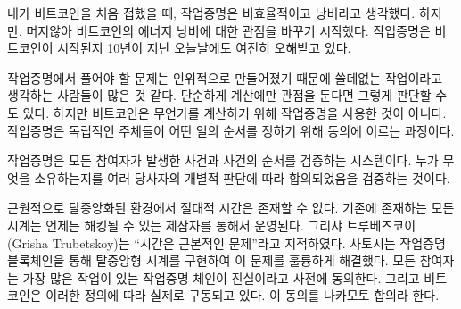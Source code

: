 \begin{comment}
When I first learned how Bitcoin works I also thought that proof-of-work
is inefficient and wasteful. After a while, I started to shift my
perspective on Bitcoin's energy consumption~\cite{gigi:energy}. It seems that
proof-of-work is still widely misunderstood today, in the year 10 AB
(after Bitcoin).
\end{comment}
내가 비트코인을 처음 접했을 때, 작업증명은 비효율적이고 낭비라고 생각했다.
하지만, 머지않아 비트코인의 에너지 낭비\cite{gigi:energy}에 대한 관점을 바꾸기 시작했다.
작업증명은 비트코인이 시작된지 10년이 지난 오늘날에도 여전히 오해받고 있다.

\begin{comment}
Since the problems to be solved in proof-of-work are made up, many
people seem to believe that it is \textit{useless} work. If the focus is purely
on the computation, this is an understandable conclusion. But Bitcoin
isn't about computation. It is about \textit{independently agreeing on the
order of things.}
\end{comment}
작업증명에서 풀어야 할 문제는 인위적으로 만들어졌기 때문에 쓸데없는 작업이라고 생각하는 사람들이 많은 것 같다.
단순하게 계산에만 관점을 둔다면 그렇게 판단할 수도 있다.
하지만 비트코인은 무언가를 계산하기 위해 작업증명을 사용한 것이 아니다.
작업증명은 독립적인 주체들이 어떤 일의 순서를 정하기 위해 동의에 이르는 과정이다.

\begin{comment}
Proof-of-work is a system in which everyone can validate what happened
and in what order it happened. This independent validation is what leads
to consensus, an individual agreement by multiple parties about who owns
what.
\end{comment}
작업증명은 모든 참여자가 발생한 사건과 사건의 순서를 검증하는 시스템이다.
누가 무엇을 소유하는지를 여러 당사자의 개별적 판단에 따라 합의되었음을 검증하는 것이다.


\begin{comment}
In a radically decentralized environment, we don't have the luxury of absolute
time. Any clock would introduce a trusted third party, a central point in the
system which had to be relied upon and could be attacked. \enquote{Timing is the root
problem,} as Grisha Trubetskoy points out~\cite{pow-clock}. And Satoshi
brilliantly solved this problem by implementing a decentralized clock via a
proof-of-work blockchain. Everyone agrees beforehand that the chain with the
most cumulative work is the source of truth. It is per definition what actually
happened. This agreement is what is now known as Nakamoto consensus.
\end{comment}
근원적으로 탈중앙화된 환경에서 절대적 시간은 존재할 수 없다.
기존에 존재하는 모든 시계는 언제든 해킹될 수 있는 제삼자를 통해서 운영된다.
그리샤 트루베츠코이(Grisha Trubetskoy)는  \enquote{시간은 근본적인 문제}라고 지적하였다\cite{pow-clock}.
사토시는 작업증명 블록체인을 통해 탈중앙형 시계를 구현하여 이 문제를 훌륭하게 해결했다.
모든 참여자는 가장 많은 작업이 있는 작업증명 체인이 진실이라고 사전에 동의한다.
그리고 비트코인은 이러한 정의에 따라 실제로 구동되고 있다.
이 동의를 나카모토 합의라 한다.

